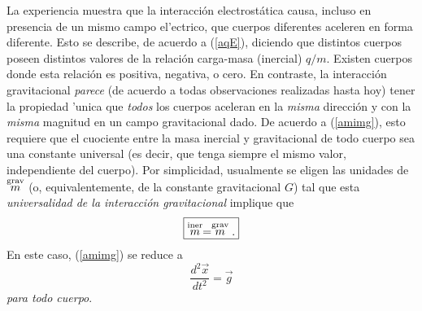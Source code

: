La experiencia muestra que la interacción electrostática causa, incluso en presencia de un mismo campo el'ectrico, que cuerpos diferentes aceleren en forma diferente. Esto se describe, de acuerdo a (\ref{aqE}), diciendo que distintos cuerpos poseen distintos valores de la relación carga-masa (inercial) $q/m$. Existen cuerpos donde esta relación es positiva, negativa, o cero. En contraste, la interacción gravitacional \textit{parece} (de acuerdo a todas observaciones realizadas hasta hoy) tener la propiedad 'unica que \textit{todos} los cuerpos aceleran en la \textit{misma} dirección y con la \textit{misma} magnitud en un campo gravitacional dado. De acuerdo a (\ref{amimg}), esto requiere que el cuociente entre la masa inercial y gravitacional de todo cuerpo sea una constante universal (es decir, que tenga siempre el mismo valor, independiente del cuerpo). Por simplicidad, usualmente se eligen las unidades de $\stackrel{\rm grav}{m}$ (o, equivalentemente, de la constante gravitacional $G$) tal que esta \textit{universalidad de la interacción gravitacional} implique que
\begin{equation}
\boxed{\stackrel{\rm iner}{m}=\stackrel{\rm grav}{m}.}
\end{equation}
En este caso, (\ref{amimg}) se reduce a
\begin{equation}\label{ag}
\frac{d^2\vec{x}}{dt^2}=\vec{g}
\end{equation}
\textit{para todo cuerpo}.


